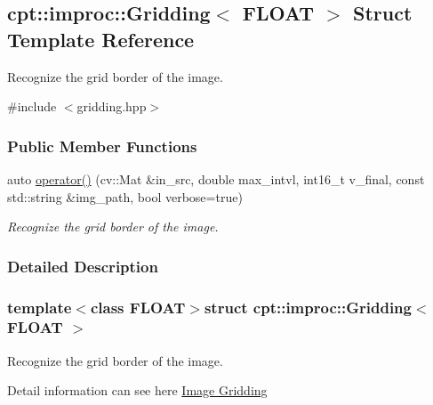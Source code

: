 \hypertarget{structcpt_1_1improc_1_1_gridding}{\subsection{cpt\-:\-:improc\-:\-:Gridding$<$ F\-L\-O\-A\-T $>$ Struct Template Reference}
\label{structcpt_1_1improc_1_1_gridding}
}


Recognize the grid border of the image.  




{\ttfamily \#include $<$gridding.\-hpp$>$}

\subsubsection*{Public Member Functions}
\begin{DoxyCompactItemize}
\item 
auto \hyperlink{structcpt_1_1improc_1_1_gridding_a1a2d0b5467474f48b1ae8fb3183cd59e}{operator()} (cv\-::\-Mat \&in\-\_\-src, double max\-\_\-intvl, int16\-\_\-t v\-\_\-final, const std\-::string \&img\-\_\-path, bool verbose=true)
\begin{DoxyCompactList}\small\item\em Recognize the grid border of the image. \end{DoxyCompactList}\end{DoxyCompactItemize}


\subsubsection{Detailed Description}
\subsubsection*{template$<$class F\-L\-O\-A\-T$>$struct cpt\-::improc\-::\-Gridding$<$ F\-L\-O\-A\-T $>$}

Recognize the grid border of the image. 

Detail information can see here \hyperlink{improc_gridding}{Image Gridding} 


